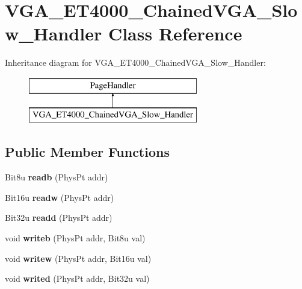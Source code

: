 \hypertarget{classVGA__ET4000__ChainedVGA__Slow__Handler}{\section{V\-G\-A\-\_\-\-E\-T4000\-\_\-\-Chained\-V\-G\-A\-\_\-\-Slow\-\_\-\-Handler Class Reference}
\label{classVGA__ET4000__ChainedVGA__Slow__Handler}
}
Inheritance diagram for V\-G\-A\-\_\-\-E\-T4000\-\_\-\-Chained\-V\-G\-A\-\_\-\-Slow\-\_\-\-Handler\-:\begin{figure}[H]
\begin{center}
\leavevmode
\includegraphics[height=2.000000cm]{classVGA__ET4000__ChainedVGA__Slow__Handler}
\end{center}
\end{figure}
\subsection*{Public Member Functions}
\begin{DoxyCompactItemize}
\item 
\hypertarget{classVGA__ET4000__ChainedVGA__Slow__Handler_af71613ea9d3ece78124d904af895b3f1}{Bit8u {\bfseries readb} (Phys\-Pt addr)}\label{classVGA__ET4000__ChainedVGA__Slow__Handler_af71613ea9d3ece78124d904af895b3f1}

\item 
\hypertarget{classVGA__ET4000__ChainedVGA__Slow__Handler_adf117d8603199f10fbb55958130a1e1b}{Bit16u {\bfseries readw} (Phys\-Pt addr)}\label{classVGA__ET4000__ChainedVGA__Slow__Handler_adf117d8603199f10fbb55958130a1e1b}

\item 
\hypertarget{classVGA__ET4000__ChainedVGA__Slow__Handler_a2bc07ce7044db33185f14d80ccd311a5}{Bit32u {\bfseries readd} (Phys\-Pt addr)}\label{classVGA__ET4000__ChainedVGA__Slow__Handler_a2bc07ce7044db33185f14d80ccd311a5}

\item 
\hypertarget{classVGA__ET4000__ChainedVGA__Slow__Handler_acf9ba81e64fc7f15863d74660bc63f31}{void {\bfseries writeb} (Phys\-Pt addr, Bit8u val)}\label{classVGA__ET4000__ChainedVGA__Slow__Handler_acf9ba81e64fc7f15863d74660bc63f31}

\item 
\hypertarget{classVGA__ET4000__ChainedVGA__Slow__Handler_ac44adfd5455e7abbdd8ecdda3f7e44a1}{void {\bfseries writew} (Phys\-Pt addr, Bit16u val)}\label{classVGA__ET4000__ChainedVGA__Slow__Handler_ac44adfd5455e7abbdd8ecdda3f7e44a1}

\item 
\hypertarget{classVGA__ET4000__ChainedVGA__Slow__Handler_ad9910b1027ebf3cb51b0f192262660c0}{void {\bfseries writed} (Phys\-Pt addr, Bit32u val)}\label{classVGA__ET4000__ChainedVGA__Slow__Handler_ad9910b1027ebf3cb51b0f192262660c0}

\end{DoxyCompactItemize}
